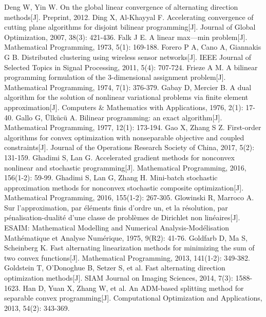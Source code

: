 \begin{thebibliography}{MM}
\begin{small}
		 Deng W, Yin W. On the global linear convergence of alternating direction methods[J]. Preprint, 2012.
		 Ding X, Al-Khayyal F. Accelerating convergence of cutting plane algorithms for disjoint bilinear programming[J]. Journal of Global Optimization, 2007, 38(3): 421-436.
		 Falk J E. A linear max—min problem[J]. Mathematical Programming, 1973, 5(1): 169-188.
		 Forero P A, Cano A, Giannakis G B. Distributed clustering using wireless sensor networks[J]. IEEE Journal of Selected Topics in Signal Processing, 2011, 5(4): 707-724.
		 Frieze A M. A bilinear programming formulation of the 3-dimensional assignment problem[J]. Mathematical Programming, 1974, 7(1): 376-379.
		 Gabay D, Mercier B. A dual algorithm for the solution of nonlinear variational problems via finite element approximation[J]. Computers \& Mathematics with Applications, 1976, 2(1): 17-40.
		 Gallo G, Ülkücü A. Bilinear programming: an exact algorithm[J]. Mathematical Programming, 1977, 12(1): 173-194.
		 Gao X, Zhang S Z. First-order algorithms for convex optimization with nonseparable objective and coupled constraints[J]. Journal of the Operations Research Society of China, 2017, 5(2): 131-159.
		 Ghadimi S, Lan G. Accelerated gradient methods for nonconvex nonlinear and stochastic programming[J]. Mathematical Programming, 2016, 156(1-2): 59-99.
		 Ghadimi S, Lan G, Zhang H. Mini-batch stochastic approximation methods for nonconvex stochastic composite optimization[J]. Mathematical Programming, 2016, 155(1-2): 267-305.
		 Glowinski R, Marroco A. Sur l'approximation, par éléments finis d'ordre un, et la résolution, par pénalisation-dualité d'une classe de problèmes de Dirichlet non linéaires[J]. ESAIM: Mathematical Modelling and Numerical Analysis-Modélisation Mathématique et Analyse Numérique, 1975, 9(R2): 41-76.
		 Goldfarb D, Ma S, Scheinberg K. Fast alternating linearization methods for minimizing the sum of two convex functions[J]. Mathematical Programming, 2013, 141(1-2): 349-382.
		 Goldstein T, O'Donoghue B, Setzer S, et al. Fast alternating direction optimization methods[J]. SIAM Journal on Imaging Sciences, 2014, 7(3): 1588-1623.
		 Han D, Yuan X, Zhang W, et al. An ADM-based splitting method for separable convex programming[J]. Computational Optimization and Applications, 2013, 54(2): 343-369.

\end{small}
\end{thebibliography}
